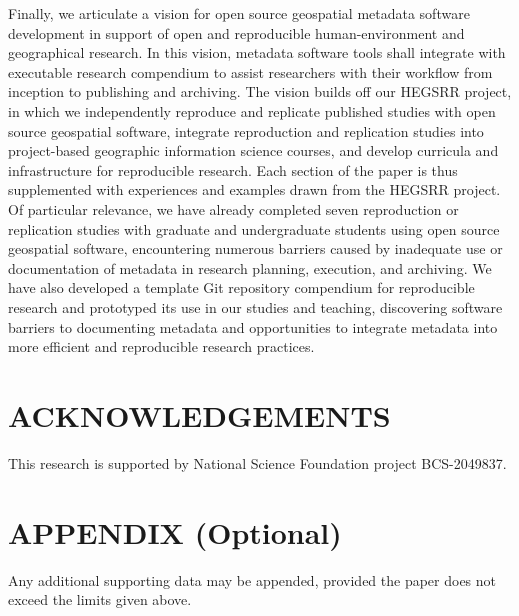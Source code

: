 \documentclass{isprs} %
\begin{document}
Finally, we articulate a vision for open source geospatial metadata software development in support of open and reproducible human-environment and geographical research.
In this vision, metadata software tools shall integrate with executable research compendium to assist researchers with their workflow from inception to publishing and archiving.
The vision builds off our HEGSRR project, in which we independently reproduce and replicate published studies with open source geospatial software, integrate reproduction and replication studies into project-based geographic information science courses, and develop curricula and infrastructure for reproducible research.
Each section of the paper is thus supplemented with experiences and examples drawn from the HEGSRR project.
Of particular relevance, we have already completed seven reproduction or replication studies with graduate and undergraduate students using open source geospatial software, encountering numerous barriers caused by inadequate use or documentation of metadata in research planning, execution, and archiving.
We have also developed a template Git repository compendium for reproducible research and prototyped its use in our studies and teaching, discovering software barriers to documenting metadata and opportunities to integrate metadata into more efficient and reproducible research practices.

\section*{ACKNOWLEDGEMENTS}\label{ACKNOWLEDGEMENTS}
This research is supported by National Science Foundation project BCS-2049837.

{
	\begin{spacing}{1.17}
		\normalsize
	\end{spacing}
}


\section*{APPENDIX (Optional)}\label{APPENDIX}

Any additional supporting data may be appended, provided the paper does not exceed the limits given above. 
\end{document}
